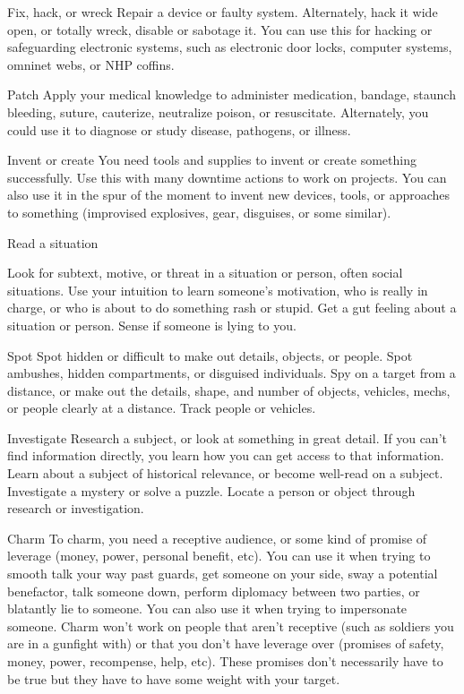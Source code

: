 Fix, hack, or wreck
Repair a device or faulty system. Alternately, hack it wide open, or totally wreck, disable or
sabotage it. You can use this for hacking or safeguarding electronic systems, such as electronic
door locks, computer systems, omninet webs, or NHP coffins.

Patch
Apply your medical knowledge to administer medication, bandage, staunch bleeding, suture,
cauterize, neutralize poison, or resuscitate. Alternately, you could use it to diagnose or study
disease, pathogens, or illness.

Invent or create
You need tools and supplies to invent or create something successfully. Use this with many
downtime actions to work on projects. You can also use it in the spur of the moment to invent new
devices, tools, or approaches to something (improvised explosives, gear, disguises, or some
similar).

Read a situation




Look for subtext, motive, or threat in a situation or person, often social situations. Use your
intuition to learn someone’s motivation, who is really in charge, or who is about to do something
rash or stupid. Get a gut feeling about a situation or person. Sense if someone is lying to you.

Spot
Spot hidden or difficult to make out details, objects, or people. Spot ambushes, hidden
compartments, or disguised individuals. Spy on a target from a distance, or make out the details,
shape, and number of objects, vehicles, mechs, or people clearly at a distance. Track people or
vehicles.

Investigate
Research a subject, or look at something in great detail. If you can’t find information directly, you
learn how you can get access to that information. Learn about a subject of historical relevance, or
become well-read on a subject. Investigate a mystery or solve a puzzle. Locate a person or object
through research or investigation.

Charm
To charm, you need a receptive audience, or some kind of promise of leverage (money, power,
personal benefit, etc). You can use it when trying to smooth talk your way past guards, get
someone on your side, sway a potential benefactor, talk someone down, perform diplomacy
between two parties, or blatantly lie to someone. You can also use it when trying to impersonate
someone. Charm won’t work on people that aren’t receptive (such as soldiers you are in a
gunfight with) or that you don’t have leverage over (promises of safety, money, power,
recompense, help, etc). These promises don’t necessarily have to be true but they have to have
some weight with your target.


